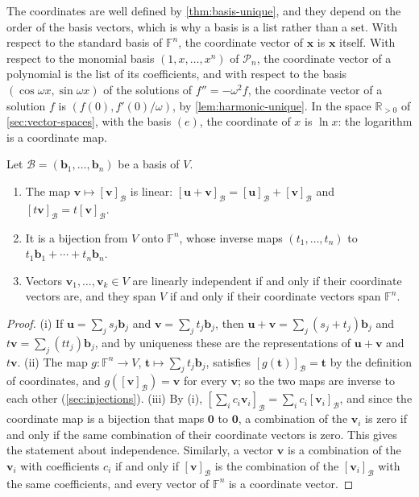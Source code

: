 The coordinates are well defined by \cref{thm:basis-unique}, and they depend on the order of the basis vectors, which is why a basis is a list rather than a set. With respect to the standard basis of $\mathbb F^n$, the coordinate vector of $\mathbf x$ is $\mathbf x$ itself. With respect to the monomial basis $(1,x,\ldots,x^n)$ of $\mathcal P_n$, the coordinate vector of a polynomial is the list of its coefficients, and with respect to the basis $(\cos\omega x,\sin\omega x)$ of the solutions of $f''=-\omega^2f$, the coordinate vector of a solution $f$ is $(f(0),f'(0)/\omega)$, by \cref{lem:harmonic-unique}. In the space $\mathbb R_{>0}$ of \cref{sec:vector-spaces}, with the basis $(e)$, the coordinate of $x$ is $\ln x$: the logarithm is a coordinate map.

\begin{theorem}
\label{thm:coordinate-map}
Let $\mathcal B=(\mathbf b_1,\ldots,\mathbf b_n)$ be a basis of $V$.
\begin{enumerate}
\item The map $\mathbf v\mapsto[\mathbf v]_{\mathcal B}$ is linear: $[\mathbf u+\mathbf v]_{\mathcal B}=[\mathbf u]_{\mathcal B}+[\mathbf v]_{\mathcal B}$ and $[t\mathbf v]_{\mathcal B}=t[\mathbf v]_{\mathcal B}$.
\item It is a bijection from $V$ onto $\mathbb F^n$, whose inverse maps $(t_1,\ldots,t_n)$ to $t_1\mathbf b_1+\cdots+t_n\mathbf b_n$.
\item Vectors $\mathbf v_1,\ldots,\mathbf v_k\in V$ are linearly independent if and only if their coordinate vectors are, and they span $V$ if and only if their coordinate vectors span $\mathbb F^n$.
\end{enumerate}
\end{theorem}

\begin{proof}
(i) If $\mathbf u=\sum_js_j\mathbf b_j$ and $\mathbf v=\sum_jt_j\mathbf b_j$, then $\mathbf u+\mathbf v=\sum_j(s_j+t_j)\mathbf b_j$ and $t\mathbf v=\sum_j(tt_j)\mathbf b_j$, and by uniqueness these are the representations of $\mathbf u+\mathbf v$ and $t\mathbf v$. (ii) The map $g\colon\mathbb F^n\to V$, $\mathbf t\mapsto\sum_jt_j\mathbf b_j$, satisfies $[g(\mathbf t)]_{\mathcal B}=\mathbf t$ by the definition of coordinates, and $g([\mathbf v]_{\mathcal B})=\mathbf v$ for every $\mathbf v$; so the two maps are inverse to each other (\cref{sec:injections}). (iii) By (i), $[\sum_ic_i\mathbf v_i]_{\mathcal B}=\sum_ic_i[\mathbf v_i]_{\mathcal B}$, and since the coordinate map is a bijection that maps $\mathbf 0$ to $\mathbf 0$, a combination of the $\mathbf v_i$ is zero if and only if the same combination of their coordinate vectors is zero. This gives the statement about independence. Similarly, a vector $\mathbf v$ is a combination of the $\mathbf v_i$ with coefficients $c_i$ if and only if $[\mathbf v]_{\mathcal B}$ is the combination of the $[\mathbf v_i]_{\mathcal B}$ with the same coefficients, and every vector of $\mathbb F^n$ is a coordinate vector.
\end{proof}

